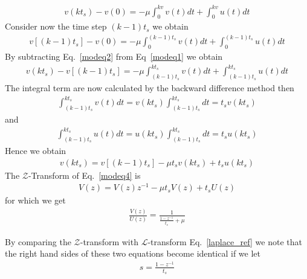 \documentclass[12pt,a4paper,oneside]{book}
\begin{document}
\begin{onehalfspace}
\begin{example}
\begin{equation}
	\begin{split}
		v(kt_s)-v(0) = - \mu \int_{0}^{kv} v(t) dt + \int_{0}^{kv} u(t) dt
	\end{split}
\end{equation}
Consider now the time step $(k-1)t_s$ we obtain
\begin{equation}\label{modeq2}
	\begin{split}
		v\left[(k-1)t_s\right] -v(0) = - \mu \int_{0}^{(k-1)t_s} v(t) dt + \int_{0}^{(k-1)t_s} u(t) dt
	\end{split}
\end{equation}
By subtracting Eq.~\eqref{modeq2} from Eq~\eqref{modeq1} we obtain
\begin{equation}\label{modeq3}
	\begin{split}
		v(kt_s) - v\left[(k-1)t_s\right] = - \mu \int_{(k-1)t_s}^{kt_s} v(t) dt + \int_{(k-1)t_s}^{kt_s} u(t) dt
	\end{split}
\end{equation}
The integral term are now calculated by the backward difference method then
\begin{equation}
	\begin{split}
		\int_{(k-1)t_s}^{kt_s} v(t) dt = v(kt_s) \int_{(k-1)t_s}^{kt_s}  dt 
		=t_s v(kt_s)
	\end{split}
\end{equation}
and 
\begin{equation}
	\begin{split}
		\int_{(k-1)t_s}^{kt_s} u(t) dt =  u(kt_s) \int_{(k-1)t_s}^{kt_s} dt 
		=t_s u(kt_s)
	\end{split}
\end{equation}
Hence we obtain 
\begin{equation}\label{modeq4}
	\begin{split}
		v(kt_s) = v\left[(k-1)t_s\right] - \mu t_s v(kt_s) + t_s u(kt_s)
	\end{split}
\end{equation}
The $\mathcal{Z}$-Transform of Eq.~\eqref{modeq4} is 
\begin{equation}
	\begin{split}
		V(z) = V(z)z^{-1}-\mu t_s V(z) + t_s U(z)
	\end{split}
\end{equation}
for which we get
\begin{equation}
	\begin{split}
		\frac{V(z)}{U(z)} = \frac{1}{\frac{1-z^{-1}}{t_s}+\mu}
	\end{split}
\end{equation}
\begin{mybox}
	By comparing the $\mathcal{Z}$-transform with $\mathcal{L}$-transform 
	Eq.~\eqref{laplace_ref} we note that the right hand sides of these two 
	equations become identical if we let
	\begin{equation}\label{mapping}
		\begin{split}
			s = \frac{1-z^{-1}}{t_s}
		\end{split}
	\end{equation}
\end{mybox}


\end{example}
\end{onehalfspace}
\end{document}
